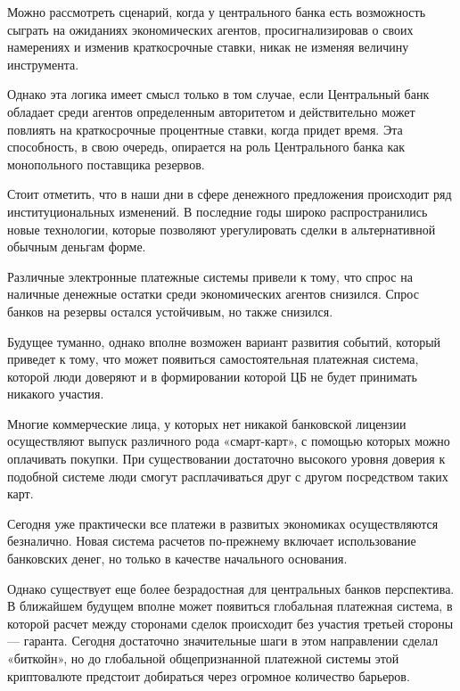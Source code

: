 \documentclass[14pt,a4paper, oneside]{extreport}
\theoremstyle{plain}              %
\theoremstyle{definition}         %
\begin{document}
Можно рассмотреть сценарий, когда у центрального банка есть возможность сыграть на ожиданиях экономических агентов, просигнализировав о своих намерениях и изменив краткосрочные ставки, никак не изменяя величину инструмента.  

Однако эта логика имеет смысл только в том случае, если Центральный банк обладает среди агентов определенным авторитетом и действительно может повлиять на краткосрочные процентные ставки, когда придет время. Эта способность, в свою очередь, опирается на роль Центрального банка как монопольного поставщика резервов. 

Стоит отметить, что в наши дни в сфере денежного предложения происходит ряд институциональных изменений. 
В последние годы широко распространились новые технологии, которые позволяют урегулировать сделки в альтернативной обычным деньгам форме. 

Различные электронные платежные системы привели к тому, что спрос на наличные денежные остатки среди экономических агентов снизился. Спрос банков на резервы остался устойчивым, но также снизился. 

Будущее туманно, однако вполне возможен вариант развития событий, который приведет к тому, что может появиться самостоятельная платежная система, которой люди доверяют и в формировании которой ЦБ не будет принимать никакого участия.

Многие коммерческие лица, у которых нет никакой банковской лицензии осуществляют выпуск различного рода «смарт-карт», с помощью которых можно оплачивать покупки. При существовании достаточно высокого уровня доверия к подобной системе люди смогут расплачиваться друг с другом посредством таких карт.  

Сегодня уже практически все платежи в развитых экономиках осуществляются безналично. Новая система расчетов  по-прежнему включает использование банковских денег, но только в качестве начального основания. 

Однако существует еще более безрадостная для центральных банков перспектива. В ближайшем будущем вполне может появиться глобальная платежная система, в которой расчет между сторонами сделок происходит без участия третьей стороны --- гаранта. Сегодня достаточно значительные шаги в этом направлении сделал «биткойн», но до глобальной общепризнанной платежной системы этой криптовалюте предстоит добираться через огромное количество барьеров.
\end{document}
